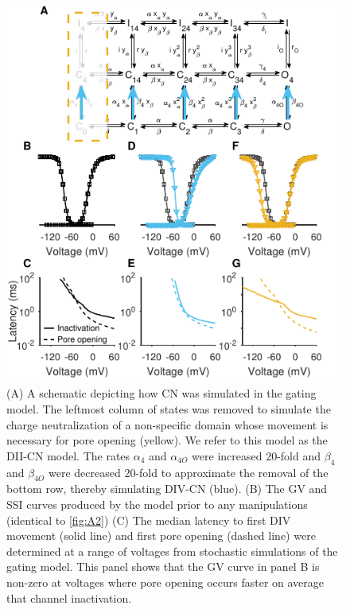 \begin{figure}[t]
\begin{minipage}[c]{85mm}
    \includegraphics[width=\textwidth]{Figures/AppendixA/figure04.pdf}
\end{minipage}\hfill
\begin{minipage}[c]{80mm}
    \caption{
    (A) A schematic depicting how CN was simulated in the gating model. The leftmost column of states was removed to simulate the charge neutralization of a non-specific domain whose movement is necessary for pore opening (yellow). We refer to this model as the DII-CN model. The rates $\alpha_4$ and $\alpha_{4O}$ were increased 20-fold and $\beta_4$ and $\beta_{4O}$ were decreased 20-fold to approximate the removal of the bottom row, thereby simulating DIV-CN (blue).
    (B) The GV and SSI curves produced by the model prior to any manipulations (identical to \autoref{fig:A2})
    (C) The median latency to first DIV movement (solid line) and first pore opening (dashed line) were determined at a range of voltages from stochastic simulations of the gating model. This panel shows that the GV curve in panel B is non-zero at voltages where pore opening occurs faster on average that channel inactivation.
}
\end{minipage}
\end{figure}
